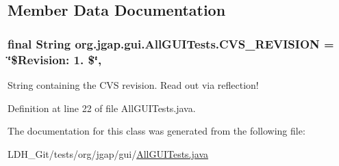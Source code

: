 \subsection{Member Data Documentation}
\hypertarget{classorg_1_1jgap_1_1gui_1_1_all_g_u_i_tests_a4e3bef38425e27029ee9911dcae4d82f}{
\subsubsection[{C\-V\-S\-\_\-\-R\-E\-V\-I\-S\-I\-O\-N}]{\setlength{\rightskip}{0pt plus 5cm}final String org.\-jgap.\-gui.\-All\-G\-U\-I\-Tests.\-C\-V\-S\-\_\-\-R\-E\-V\-I\-S\-I\-O\-N = \char`\"{}\$Revision\-: 1. \$\char`\"{}\hspace{0.3cm}{\ttfamily [static]}, {\ttfamily [private]}}}\label{classorg_1_1jgap_1_1gui_1_1_all_g_u_i_tests_a4e3bef38425e27029ee9911dcae4d82f}
String containing the C\-V\-S revision. Read out via reflection! 

Definition at line 22 of file All\-G\-U\-I\-Tests.\-java.



The documentation for this class was generated from the following file\-:\begin{DoxyCompactItemize}
\item 
L\-D\-H\-\_\-\-Git/tests/org/jgap/gui/\hyperlink{_all_g_u_i_tests_8java}{All\-G\-U\-I\-Tests.\-java}\end{DoxyCompactItemize}
